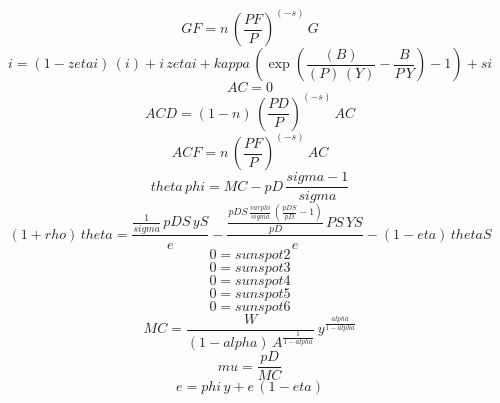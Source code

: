 \begin{dmath}
{GF}={n}\, \left(\frac{{PF}}{{P}}\right)^{\left(-{s}\right)}\, {G}
\end{dmath}
\begin{dmath}
{i}=\left(1-{zetai}\right)\, ({i})+{i}\, {zetai}+{kappa}\, \left(\exp\left(\frac{({B})}{({P})\, ({Y})}-\frac{{B}}{{P}\, {Y}}\right)-1\right)+{si}
\end{dmath}
\begin{dmath}
{AC}=0
\end{dmath}
\begin{dmath}
{ACD}=\left(1-{n}\right)\, \left(\frac{{PD}}{{P}}\right)^{\left(-{s}\right)}\, {AC}
\end{dmath}
\begin{dmath}
{ACF}={n}\, \left(\frac{{PF}}{{P}}\right)^{\left(-{s}\right)}\, {AC}
\end{dmath}
\begin{dmath}
{theta}\, {phi}={MC}-{pD}\, \frac{{sigma}-1}{{sigma}}
\end{dmath}
\begin{dmath}
\left(1+{rho}\right)\, {theta}=\frac{\frac{1}{{sigma}}\, {pDS}\, {yS}}{{e}}-\frac{\frac{{pDS}\, \frac{{varphi}}{{sigma}}\, \left(\frac{{pDS}}{{pD}}-1\right)}{{pD}}\, {PS}\, {YS}}{{e}}-\left(1-{eta}\right)\, {thetaS}
\end{dmath}
\begin{dmath}
0={sunspot2}
\end{dmath}
\begin{dmath}
0={sunspot3}
\end{dmath}
\begin{dmath}
0={sunspot4}
\end{dmath}
\begin{dmath}
0={sunspot5}
\end{dmath}
\begin{dmath}
0={sunspot6}
\end{dmath}
\begin{dmath}
{MC}=\frac{{W}}{\left(1-{alpha}\right)\, {A}^{\frac{1}{1-{alpha}}}}\, {y}^{\frac{{alpha}}{1-{alpha}}}
\end{dmath}
\begin{dmath}
{mu}=\frac{{pD}}{{MC}}
\end{dmath}
\begin{dmath}
{e}={phi}\, {y}+{e}\, \left(1-{eta}\right)
\end{dmath}
